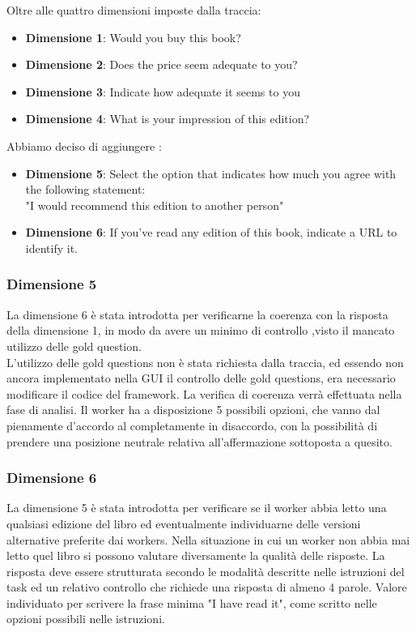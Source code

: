 \documentclass[a4paper,11pt]{report}
\begin{document}
Oltre alle quattro dimensioni imposte dalla traccia:
\begin{itemize}
	\item \textbf{Dimensione 1}: Would you buy this book?
	\item \textbf{Dimensione 2}: Does the price seem adequate to you?
	\item \textbf{Dimensione 3}: Indicate how adequate it seems to you
	\item \textbf{Dimensione 4}: What is your impression of this edition?
\end{itemize}
Abbiamo deciso di aggiungere :
\begin{itemize}
	\item \textbf{Dimensione 5}: Select the option that indicates how much you agree with the following statement: \\ "I would recommend this edition to another person"
	\item \textbf{Dimensione 6}: If you've read any edition of this book, indicate a URL to identify it.
\end{itemize}
\subsubsection{Dimensione 5}
La dimensione 6 è stata introdotta per verificarne la coerenza con la risposta della dimensione 1, in modo da avere un minimo di controllo ,visto il mancato utilizzo delle gold question.\\
L'utilizzo delle gold questions non è stata richiesta dalla traccia, ed essendo non ancora implementato nella GUI il controllo delle gold questions, era necessario modificare il codice del framework. La verifica di coerenza verrà effettuata nella fase di analisi.
Il worker ha a disposizione 5 possibili opzioni, che vanno dal pienamente d'accordo al completamente in disaccordo, con la possibilità di prendere una posizione neutrale relativa all'affermazione sottoposta a quesito.
\subsubsection{Dimensione 6}
La dimensione 5 è stata introdotta per verificare se il worker abbia letto una qualsiasi edizione del libro ed eventualmente individuarne delle versioni alternative preferite dai workers. Nella situazione in cui un worker non abbia mai letto quel libro si possono valutare diversamente la qualità delle risposte.   
La risposta deve essere strutturata secondo le modalità descritte nelle istruzioni del task ed un relativo controllo che richiede una risposta di almeno 4 parole. Valore individuato per scrivere la frase minima "I have read it", come scritto nelle opzioni possibili nelle istruzioni.
\end{document}
